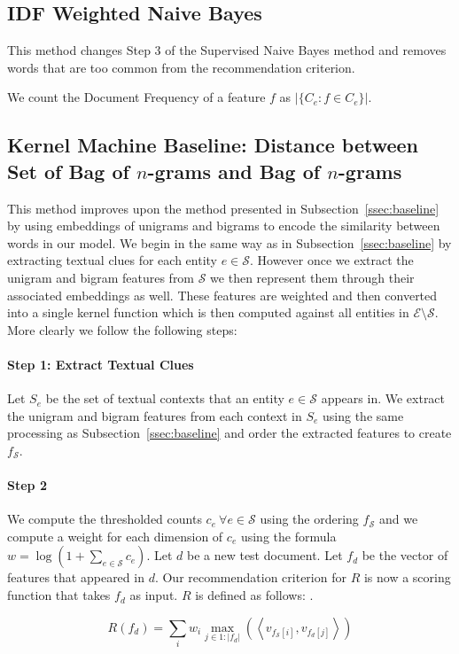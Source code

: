 \documentclass{article}
\newcommand{\ssecref}[1]{Subsection~\ref{#1}}
\newcommand{\ems}{$\mathcal{E} \setminus \mathcal{S}$}
\newcommand{\vip}[2]{\left\langle v_{#1}, v_{#2} \right\rangle}
\newcommand{\Todo}[1]{\todo[author=Pushpendre,size=\small,inline]{#1}}
\begin{document}
\subsection{IDF Weighted Naive Bayes}
\label{ssec:idf-weighted-nb}
This method changes Step 3 of the Supervised Naive Bayes method and removes
words that are too common from the recommendation criterion.

We count the Document Frequency of a feature $f$ as $|\{C_e : f \in C_e\}|$.
\subsection{Kernel Machine Baseline: Distance between Set of Bag of $n$-grams
  and Bag of $n$-grams}
\label{sec:kernel-machine}
This method improves upon the method presented in \ssecref{ssec:baseline}
by using embeddings of unigrams and bigrams to encode the similarity between
words in our model. We begin in the same way as in \ssecref{ssec:baseline}
by extracting textual clues for each entity $e \in \mathcal{S}$. However once
we extract the unigram and bigram features from $\mathcal{S}$ we then represent
them through their associated embeddings as well. These features are weighted
and then converted into a single kernel function which is then computed against
all entities in \ems. More clearly we follow the following steps:
\paragraph{Step 1: Extract Textual Clues}
Let $S_e$ be the set of textual contexts that an entity $e \in \mathcal{S}$
appears in. We extract the unigram and bigram features from each context in
$S_e$ using the same processing as \ssecref{ssec:baseline} and order the
extracted features to create $f_{\mathcal{S}}$.
\paragraph{Step 2}
We compute the thresholded counts $c_e \ \forall e \in \mathcal{S}$ using the
ordering $f_{\mathcal{S}}$ and we
compute a weight for each dimension of $c_e$ using the formula
$w = \log \left(1 + {\sum_{e \in \mathcal{S}}c_e}\right)$.
Let $d$ be a new test document.
Let $f_d$ be the vector of features that appeared in $d$.
Our recommendation criterion for $R$ is now a scoring
function that takes $f_d$ as input.
$R$ is defined as follows:
\Todo{$R$ is mercer.}.

\begin{equation}
  \label{eq:baseline-wsim-rc}
  R(f_d) = \sum_i w_i \max_{j \in 1:|f_d|}(\vip{f_{\mathcal{S}}[i]}{f_d[j]})
\end{equation}
\end{document}
